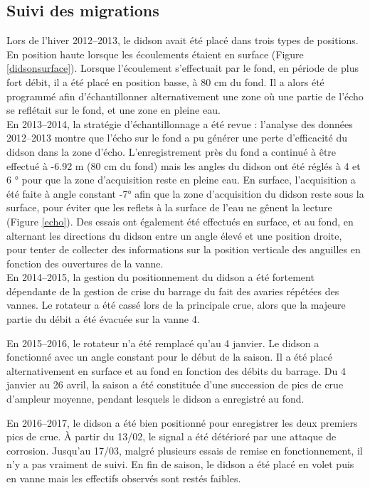 \documentclass[11pt,twocolumn,titlepage,twoside]{article}
\begin{document}
\subsection{Suivi des migrations}

Lors de l'hiver 2012--2013, le didson avait été placé dans trois types de
positions. En position haute lorsque les écoulements étaient en
surface (Figure \ref{didsonsurface}). Lorsque l'écoulement s'effectuait
par le fond, en période de plus fort débit, il a été placé en position basse, à
80 cm du fond. Il a alors été programmé afin d'échantillonner alternativement
une zone où une partie de l'écho se reflétait sur le fond, et une zone en pleine
eau.\\

En 2013--2014, la stratégie d'échantillonnage a été revue : l'analyse des
données 2012--2013 montre que l'écho sur le fond a pu générer une perte
d'efficacité du didson dans la zone d'écho. L'enregistrement près du fond a continué à être
effectué à -6.92 m (80 cm du fond) mais les angles du didson ont été réglés à 4
et 6 ° pour que la zone d'acquisition reste en pleine eau. En surface,
l'acquisition a été faite à angle constant \ang{-7} afin que la
zone d'acquisition du didson reste sous la surface, pour éviter que les reflets à la surface de l'eau ne gênent la lecture (Figure
\ref{echo}).
Des essais ont également été effectués en surface, et au fond, en alternant
les directions du didson entre un angle élevé et une position droite,
pour tenter de collecter des informations sur 
la position verticale des anguilles en fonction
des ouvertures de la vanne.  \\

En 2014--2015, la gestion du positionnement du didson a été fortement dépendante
de la gestion de crise du barrage du fait des avaries répétées des vannes. Le
rotateur a été cassé lors de la principale crue, alors que la majeure partie du
débit a été évacuée sur la vanne 4.

En 2015--2016, le rotateur n'a été remplacé qu'au 4 janvier. Le didson a
fonctionné avec un angle constant pour le début de la saison. Il a été placé
alternativement en surface et au fond en fonction des débits du barrage. 
Du 4 janvier au 26 avril, la saison a été constituée d'une
succession de pics de crue d'ampleur moyenne, pendant lesquels le didson
a enregistré au fond. 

En 2016--2017, le didson a été bien positionné pour enregistrer les deux
premiers pics de crue. À partir du 13/02, le signal a été détérioré par une
attaque de corrosion. Jusqu'au 17/03, malgré plusieurs essais de remise en
fonctionnement, il n'y a pas vraiment de suivi. En fin de saison, le didson a
été placé en volet puis en vanne mais les effectifs observés sont restés
faibles.
\end{document}
